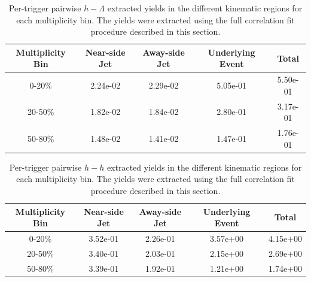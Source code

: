 \documentclass[ALICE,manyauthors]{ALICE_analysis_notes}
\begin{document}
\begin{table}[h!]
\centering
\begin{tabular}{| c | c | c | c | c | }
\hline
Multiplicity Bin & Near-side Jet & Away-side Jet & Underlying Event & Total  \\
\hline
	
0-20\% & 2.24e-02  & 2.29e-02  & 5.05e-01 & 5.50e-01 \\
20-50\% & 1.82e-02 & 1.84e-02  & 2.80e-01 & 3.17e-01 \\
50-80\% & 1.48e-02 & 1.41e-02  & 1.47e-01 & 1.76e-01 \\
	
\hline
\end{tabular}
\caption{Per-trigger pairwise $h-\Lambda$ extracted yields in the different kinematic regions for each multiplicity bin. The yields were extracted using the full correlation fit procedure described in this section.}
\label{h_lambda_yield_table_fullfit}
\end{table}
	
\begin{table}[h!]
\centering
\begin{tabular}{| c | c | c | c | c | }
\hline
Multiplicity Bin & Near-side Jet & Away-side Jet & Underlying Event & Total  \\
\hline

0-20\% & 3.52e-01  & 2.26e-01  & 3.57e+00 & 4.15e+00 \\
20-50\% & 3.40e-01 & 2.03e-01  & 2.15e+00 & 2.69e+00 \\
50-80\% & 3.39e-01 & 1.92e-01  & 1.21e+00 & 1.74e+00 \\

\hline
\end{tabular}
\caption{Per-trigger pairwise $h-h$ extracted yields in the different kinematic regions for each multiplicity bin. The yields were extracted using the full correlation fit procedure described in this section.}
\label{h_h_yield_table_fullfit}
\end{table}

\clearpage
\end{document}
